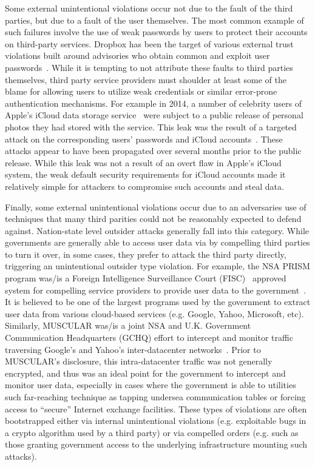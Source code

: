 Some external unintentional violations occur not due to the fault of the
third parties, but due to a fault of the user themselves. The most
common example of such failures involve the use of weak passwords by
users to protect their accounts on third-party services.  Dropbox has
been the target of various external trust violations built around
advisories who obtain common and exploit user
passwords~\cite{dropbox-passwords}. While it is tempting to not
attribute these faults to third parties themselves, third party service
providers must shoulder at least some of the blame for allowing users
to utilize weak credentials or similar error-prone authentication
mechanisms. For example in 2014, a number of celebrity users of
Apple's iCloud data storage service~\cite{apple-icloud} were subject
to a public release of personal photos they had stored with the
service. This leak was the result of a targeted attack on the
corresponding users' passwords and iCloud
accounts~\cite{apple-icloudleak}. These attacks appear to have been
propagated over several months prior to the public release. While this
leak was not a result of an overt flaw in Apple's iCloud system, the
weak default security requirements for iCloud accounts made it
relatively simple for attackers to compromise such accounts and steal
data.

Finally, some external unintentional violations occur due to an
adversaries use of techniques that many third parities could not be
reasonably expected to defend against. Nation-state level outsider
attacks generally fall into this category. While governments are
generally able to access user data via by compelling third parties to
turn it over, in some cases, they prefer to attack the third party
directly, triggering an unintentional outsider type violation. For
example, the NSA PRISM program was/is a Foreign Intelligence
Surveillance Court (FISC)~\cite{fisc} approved system for compelling
service providers to provide user data to the
government~\cite{greenwald-prism}. It is believed to be one of the
largest programs used by the government to extract user data from
various cloud-based services (e.g. Google, Yahoo, Microsoft,
etc). Similarly, MUSCULAR was/is a joint NSA and U.K. Government
Communication Headquarters (GCHQ) effort to intercept and monitor
traffic traversing Google's and Yahoo's inter-datacenter
networks~\cite{gellman-muscular}. Prior to MUSCULAR's disclosure, this
intra-datacenter traffic was not generally encrypted, and thus was an
ideal point for the government to intercept and monitor user data,
especially in cases where the government is able to utilities such
far-reaching technique as tapping undersea communication tables or
forcing access to ``secure'' Internet exchange facilities. These types
of violations are often bootstrapped either via internal unintentional
violations (e.g. exploitable bugs in a crypto algorithm used by a
third party) or via compelled orders (e.g. such as those granting
government access to the underlying infrastructure mounting such
attacks).

